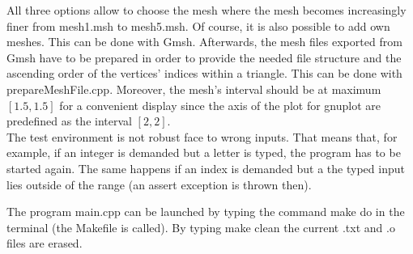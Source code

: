 \documentclass[10pt]{article}
\begin{document}
	All three options allow to choose the mesh where the mesh becomes increasingly finer from mesh1.msh to mesh5.msh. 
	Of course, it is also possible to add own meshes. This can be done with {\ttfamily Gmsh}. Afterwards, the mesh files exported from {\ttfamily Gmsh} have to be prepared in order to provide the needed file structure and the ascending order of the vertices' indices within a triangle. This can be done with prepareMeshFile.cpp. Moreover, the mesh's interval should be at maximum $ [1.5,1.5] $ for a convenient display since the axis of the plot for {\ttfamily gnuplot} are predefined as the interval $ [2,2] $. \\
	The test environment is not robust face to wrong inputs. That means that, for example, if an integer is demanded but a letter is typed, the program has to be started again. The same happens if an index is demanded but a the typed input lies outside of the range (an assert exception is thrown then).
	
	The program main.cpp can be launched by typing the command {\ttfamily make do} in the terminal (the {\ttfamily Makefile} is called). By typing {\ttfamily make clean} the current .txt and .o files are erased.
	
	\begin{figure}[h]
	\end{figure}
	
\end{document}
